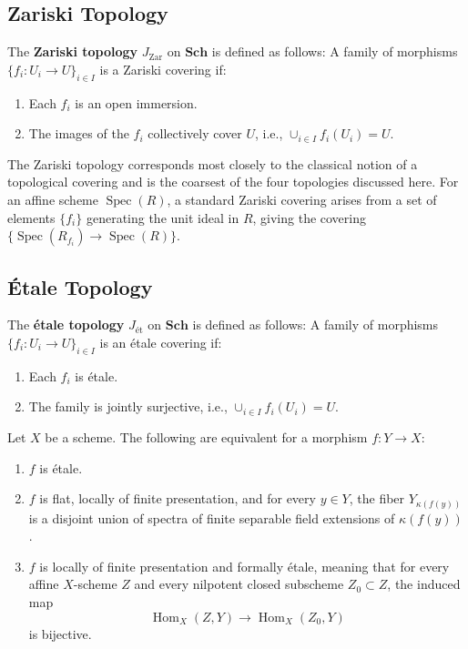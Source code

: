 \documentclass[12pt]{article}
\begin{document}
\subsection{Zariski Topology}

\begin{definition}
    The \textbf{Zariski topology} $J_{\textrm{Zar}}$ on $\mathbf{Sch}$ is defined as follows: A family of morphisms $\{f_i: U_i \to U\}_{i \in I}$ is a Zariski covering if:
    \begin{enumerate}
        \item Each $f_i$ is an open immersion.
        \item The images of the $f_i$ collectively cover $U$, i.e., $\cup_{i \in I} f_i(U_i) = U$.
    \end{enumerate}
\end{definition}

\begin{remark}
    The Zariski topology corresponds most closely to the classical notion of a topological covering and is the coarsest of the four topologies discussed here. For an affine scheme $\operatorname{Spec}(R)$, a standard Zariski covering arises from a set of elements $\{f_i\}$ generating the unit ideal in $R$, giving the covering $\{\operatorname{Spec}(R_{f_i}) \to \operatorname{Spec}(R)\}$.
\end{remark}

\subsection{Étale Topology}

\begin{definition}
    The \textbf{étale topology} $J_{\textrm{ét}}$ on $\mathbf{Sch}$ is defined as follows: A family of morphisms $\{f_i: U_i \to U\}_{i \in I}$ is an étale covering if:
    \begin{enumerate}
        \item Each $f_i$ is étale.
        \item The family is jointly surjective, i.e., $\cup_{i \in I} f_i(U_i) = U$.
    \end{enumerate}
\end{definition}

\begin{proposition}
    Let $X$ be a scheme. The following are equivalent for a morphism $f: Y \to X$:
    \begin{enumerate}
        \item $f$ is étale.
        \item $f$ is flat, locally of finite presentation, and for every $y \in Y$, the fiber $Y_{\kappa(f(y))}$ is a disjoint union of spectra of finite separable field extensions of $\kappa(f(y))$.
        \item $f$ is locally of finite presentation and formally étale, meaning that for every affine $X$-scheme $Z$ and every nilpotent closed subscheme $Z_0 \subset Z$, the induced map \[\operatorname{Hom}_X(Z, Y) \to \operatorname{Hom}_X(Z_0, Y)\] is bijective.
    \end{enumerate}
\end{proposition}
\end{document}
